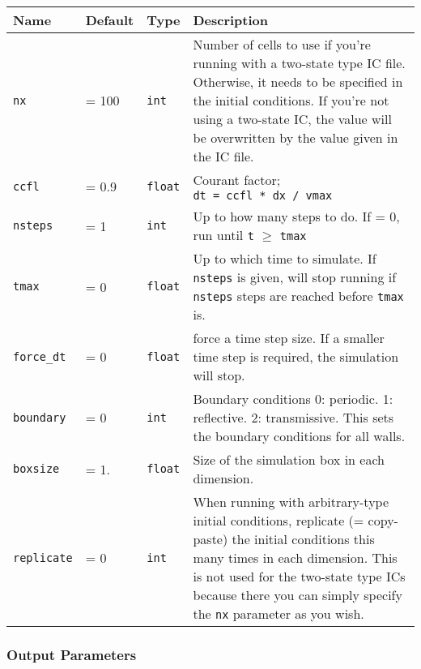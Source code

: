 \begin{tabular}[c]{p{2.5cm} p{1.5cm} p{} p{}}
Name & Default & Type & Description \\
\hline
\hline
\texttt{nx} &
    = 100 &
    \texttt{int} &
    Number of cells to use if you're running with a two-state type IC file.
    Otherwise, it needs to be specified in the initial conditions. If you're not
    using a two-state IC, the value will be overwritten by the value given in
    the IC file.
\\ \hline
\texttt{ccfl} &
    = 0.9 &
    \texttt{float} &
    Courant factor; \texttt{dt\ =\ ccfl\ *\ dx\ /\ vmax}
\\ \hline
\texttt{nsteps} &
    = 1 &
    \texttt{int} &
    Up to how many steps to do. If = 0, run until \texttt{t}
    $\geq$ \texttt{tmax}
\\ \hline
\texttt{tmax} &
    = 0 &
    \texttt{float} &
    Up to which time to simulate. If \texttt{nsteps} is given, will stop running
    if \texttt{nsteps} steps are reached before \texttt{tmax} is.
\\ \hline
\texttt{force\_dt} &
    = 0 &
    \texttt{float} &
    force a time step size. If a smaller time step is required, the simulation
    will stop.
\\ \hline
\texttt{boundary} &
    = 0 &
    \texttt{int} &
    Boundary conditions 0: periodic. 1: reflective. 2: transmissive. This sets
    the boundary conditions for all walls.
\\ \hline
\texttt{boxsize} &
    = 1. &
    \texttt{float} &
    Size of the simulation box in each dimension.
\\ \hline
\texttt{replicate} &
    = 0 &
    \texttt{int} &
    When running with arbitrary-type initial conditions, replicate (=
    copy-paste) the initial conditions this many times in each dimension. This
    is not used for the two-state type ICs because there you can simply specify
    the \texttt{nx} parameter as you wish.
\\ \hline
\end{tabular}







\subsubsection{Output Parameters}

